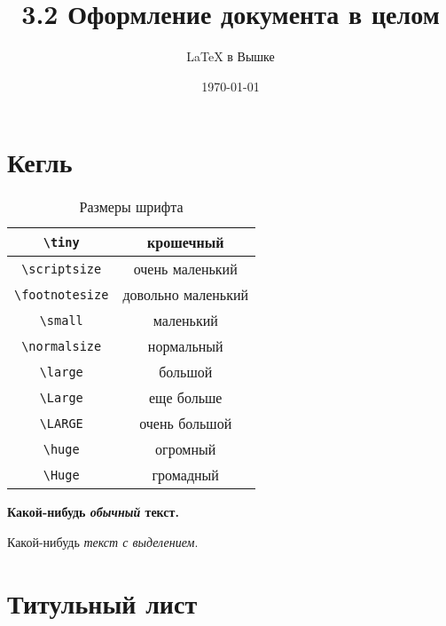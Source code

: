 \documentclass[a4paper,12pt]{article}
\author{\LaTeX{} в Вышке}
\title{3.2 Оформление документа в целом}
\date{\today}
\theoremstyle{plain} %
\theoremstyle{definition} %
\theoremstyle{remark} %
\begin{document}

\maketitle

\section{Кегль}

\begin{table}[h!]
	\caption{Размеры шрифта}
	\centering
		\begin{tabular}{|c|c|}
		\hline	\verb|\tiny|      & \tiny        крошечный \\
		\hline	\verb|\scriptsize|   & \scriptsize  очень маленький\\
			\hline \verb|\footnotesize| & \footnotesize  довольно маленький \\
			\hline \verb|\small|        &  \small        маленький \\
			\hline \verb|\normalsize|   &  \normalsize  нормальный \\
			\hline \verb|\large|        &  \large       большой \\
			\hline \verb|\Large|        &  \Large       еще больше \\[5pt]
			\hline \verb|\LARGE|        &  \LARGE       очень большой \\[5pt]
			\hline \verb|\huge|         &  \huge        огромный \\[5pt]
			\hline \verb|\Huge|         &  \Huge        громадный \\ \hline
		\end{tabular}
\end{table}

\begin{Huge}
	\textbf{Какой-нибудь \textit{обычный}  текст.}
\end{Huge}

Какой-нибудь \emph{текст \emph{с} выделением}.

\section{Титульный лист}
\end{document}
